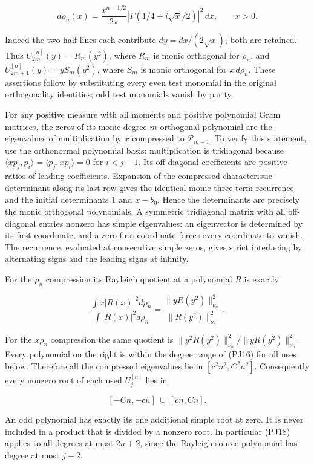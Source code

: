 \documentclass[10pt]{article}
\begin{document}
\[
d\rho_n(x)=\frac{x^{n-1/2}}{2\pi}
|\Gamma(1/4+i\sqrt{x}/2)|^2\,dx,\qquad x>0.
\tag{PJ17}
\]

Indeed the two half-lines each contribute \(dy=dx/(2\sqrt{x})\); both are retained. Thus \(U_{2m}^{[n]}(y)=R_m(y^2)\), where \(R_m\) is monic orthogonal for \(\rho_n\), and \(U_{2m+1}^{[n]}(y)=yS_m(y^2)\), where \(S_m\) is monic orthogonal for \(x\,d\rho_n\). These assertions follow by substituting every even test monomial in the original orthogonality identities; odd test monomials vanish by parity.

For any positive measure with all moments and positive polynomial Gram matrices, the zeros of its monic degree-\(m\) orthogonal polynomial are the eigenvalues of multiplication by \(x\) compressed to \(\mathcal P_{m-1}\). To verify this statement, use the orthonormal polynomial basis: multiplication is tridiagonal because \(\langle xp_j,p_i\rangle=\langle p_j,xp_i\rangle=0\) for \(i<j-1\). Its off-diagonal coefficients are positive ratios of leading coefficients. Expansion of the compressed characteristic determinant along its last row gives the identical monic three-term recurrence and the initial determinants \(1\) and \(x-b_0\). Hence the determinants are precisely the monic orthogonal polynomials. A symmetric tridiagonal matrix with all off-diagonal entries nonzero has simple eigenvalues: an eigenvector is determined by its first coordinate, and a zero first coordinate forces every coordinate to vanish. The recurrence, evaluated at consecutive simple zeros, gives strict interlacing by alternating signs and the leading signs at infinity.

For the \(\rho_n\) compression its Rayleigh quotient at a polynomial \(R\) is exactly

\[
\frac{\int x|R(x)|^2d\rho_n}{\int|R(x)|^2d\rho_n}
=\frac{\|yR(y^2)\|_{\nu_n}^2}{\|R(y^2)\|_{\nu_n}^2}.
\]

For the \(x\rho_n\) compression the same quotient is \(\|y^2R(y^2)\|_{\nu_n}^2/\|yR(y^2)\|_{\nu_n}^2\). Every polynomial on the right is within the degree range of (PJ16) for all uses below. Therefore all the compressed eigenvalues lie in \([c^2n^2,C^2n^2]\). Consequently every nonzero root of each used \(U_j^{[n]}\) lies in

\[
[-Cn,-cn]\ \cup\ [cn,Cn].
\tag{PJ18}
\]

An odd polynomial has exactly its one additional simple root at zero. It is never included in a product that is divided by a nonzero root. In particular (PJ18) applies to all degrees at most \(2n+2\), since the Rayleigh source polynomial has degree at most \(j-2\).
\end{document}
